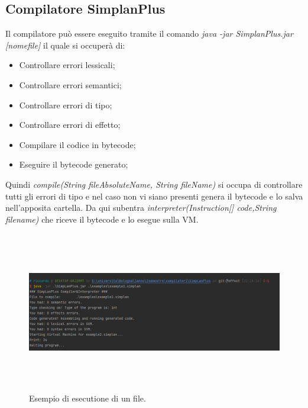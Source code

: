 \documentclass[../../main]{subfiles}
\begin{document}
\subsection{Compilatore SimplanPlus}
Il compilatore può essere eseguito tramite il comando \textit{java -jar SimplanPlus.jar [nomefile]} il quale si occuperà di:
\begin{itemize}
    \item Controllare errori lessicali;
    \item Controllare errori semantici;
    \item Controllare errori di tipo;
    \item Controllare errori di effetto;
    \item Compilare il codice in bytecode;
    \item Eseguire il bytecode generato;
\end{itemize}

Quindi \textit{compile(String fileAbsoluteName, String fileName)} si occupa di controllare tutti gli errori di tipo e nel caso non vi siano presenti
genera il bytecode e lo salva nell'apposita cartella. Da qui subentra \textit{interpreter(Instruction[] code,String filename)} che riceve il bytecode 
e lo esegue sulla VM.
\begin{figure}[H]
    \includegraphics[width=180mm,height=70mm]{images/esempioesec.png}
    \caption{Esempio di esecutione di un file.}
\end{figure}
\end{document}

